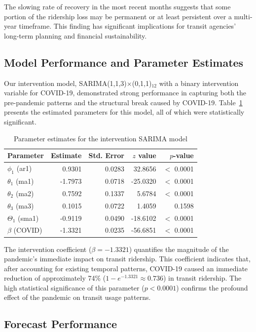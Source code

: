 \documentclass[11pt]{article}
\begin{document}
The slowing rate of recovery in the most recent months suggests that some portion of the ridership loss may be permanent or at least persistent over a multi-year timeframe. This finding has significant implications for transit agencies' long-term planning and financial sustainability.

\subsection{Model Performance and Parameter Estimates}

Our intervention model, SARIMA(1,1,3)$\times$(0,1,1)$_{12}$ with a binary intervention variable for COVID-19, demonstrated strong performance in capturing both the pre-pandemic patterns and the structural break caused by COVID-19. Table~\ref{tab:intervention_params} presents the estimated parameters for this model, all of which were statistically significant.

\begin{table}[!ht]
\centering
\caption{Parameter estimates for the intervention SARIMA model}
\label{tab:intervention_params}
\begin{tabular}{lrrrr}
\hline
Parameter & Estimate & Std. Error & $z$ value & $p$-value \\
\hline
$\phi_1$ (ar1) & 0.9301 & 0.0283 & 32.8656 & $<$ 0.0001 \\
$\theta_1$ (ma1) & -1.7973 & 0.0718 & -25.0320 & $<$ 0.0001 \\
$\theta_2$ (ma2) & 0.7592 & 0.1337 & 5.6784 & $<$ 0.0001 \\
$\theta_3$ (ma3) & 0.1015 & 0.0722 & 1.4059 & 0.1598 \\
$\Theta_1$ (sma1) & -0.9119 & 0.0490 & -18.6102 & $<$ 0.0001 \\
$\beta$ (COVID) & -1.3321 & 0.0235 & -56.6851 & $<$ 0.0001 \\
\hline
\end{tabular}
\end{table}

The intervention coefficient ($\beta = -1.3321$) quantifies the magnitude of the pandemic's immediate impact on transit ridership. This coefficient indicates that, after accounting for existing temporal patterns, COVID-19 caused an immediate reduction of approximately 74\% ($1 - e^{-1.3321} \approx 0.736$) in transit ridership. The high statistical significance of this parameter ($p < 0.0001$) confirms the profound effect of the pandemic on transit usage patterns.


\subsection{Forecast Performance}
\end{document}
